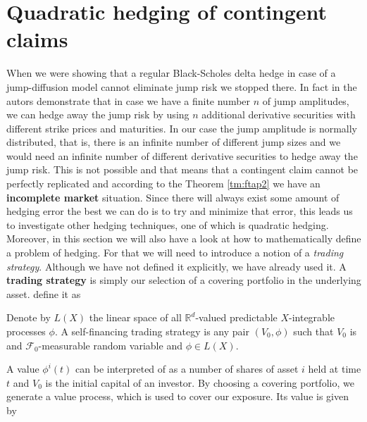 \documentclass[times, utf8, diplomski]{fer}
\begin{document}
\section{Quadratic hedging of contingent claims}
When we were showing that a regular Black-Scholes delta hedge in case of a jump-diffusion model cannot eliminate jump risk we stopped there. In fact in \cite{chiarella_derivative_2015} the autors demonstrate that in case we have a finite number $n$ of jump amplitudes, we can hedge away the jump risk by using $n$ additional derivative securities with different strike prices and maturities. In our case the jump amplitude is normally distributed, that is, there is an infinite number of different jump sizes and we would need an infinite number of different derivative securities to hedge away the jump risk. This is not possible and that means that a contingent claim cannot be perfectly replicated and according to the Theorem \ref{tm:ftap2} we have an \textbf{incomplete market} situation. Since there will always exist some amount of hedging error the best we can do is to try and minimize that error, this leads us to investigate other hedging techniques, one of which is quadratic hedging. Moreover, in this section we will also have a look at how to mathematically define a problem of hedging. For that we will need to introduce a notion of a \textit{trading strategy}. Although we have not defined it explicitly, we have already used it. A \textbf{trading strategy} is simply our selection of a covering portfolio in the underlying asset. \cite{bingham_risk-neutral_2004} define it as

\begin{definition}
	Denote by $L(X)$ the linear space of all $\mathbb{R}^d$-valued predictable $X$-integrable processes $\phi$. A self-financing trading strategy is any pair $(V_0, \phi)$ such that $V_0$ is and $\mathcal{F}_0$-measurable random variable and $\phi \in L(X)$.
\end{definition}
\noindent A value $\phi^i(t)$ can be interpreted of as a number of shares of asset $i$ held at time $t$ and $V_0$ is the initial capital of an investor. By choosing a covering portfolio, we generate a value process, which is used to cover our exposure. Its value is given by
\end{document}
